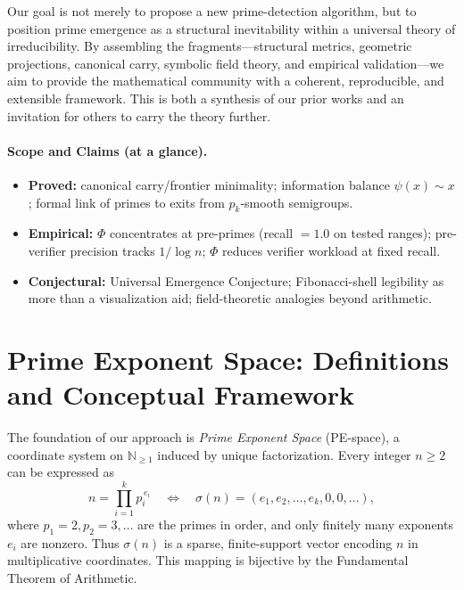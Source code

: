 \documentclass[11pt]{article}
\theoremstyle{plain}
\theoremstyle{definition}
\newcommand{\N}{\mathbb{N}}
\begin{document}
Our goal is not merely to propose a new prime-detection algorithm, but to position prime emergence as a structural inevitability within a universal theory of irreducibility. By assembling the fragments—structural metrics, geometric projections, canonical carry, symbolic field theory, and empirical validation—we aim to provide the mathematical community with a coherent, reproducible, and extensible framework. This is both a synthesis of our prior works and an invitation for others to carry the theory further.

\paragraph{Scope and Claims (at a glance).}
\begin{itemize}[leftmargin=1.5em]
  \item \textbf{Proved:} canonical carry/frontier minimality; information balance $\psi(x)\sim x$; formal link of primes to exits from $p_k$-smooth semigroups.
  \item \textbf{Empirical:} $\Phi$ concentrates at pre-primes (recall $=1.0$ on tested ranges); pre-verifier precision tracks $1/\log n$; $\Phi$ reduces verifier workload at fixed recall.
  \item \textbf{Conjectural:} Universal Emergence Conjecture; Fibonacci-shell legibility as more than a visualization aid; field-theoretic analogies beyond arithmetic.
\end{itemize}

\section{Prime Exponent Space: Definitions and Conceptual Framework}

The foundation of our approach is \emph{Prime Exponent Space} (PE-space), a coordinate system on $\N_{\geq 1}$ induced by unique factorization. Every integer $n \geq 2$ can be expressed as
\[
n = \prod_{i=1}^k p_i^{\,e_i} 
\quad \Longleftrightarrow \quad
\sigma(n) = (e_1, e_2, \ldots, e_k, 0, 0, \ldots),
\]
where $p_1=2, p_2=3, \dots$ are the primes in order, and only finitely many exponents $e_i$ are nonzero. Thus $\sigma(n)$ is a sparse, finite-support vector encoding $n$ in multiplicative coordinates. This mapping is bijective by the Fundamental Theorem of Arithmetic.
\end{document}
